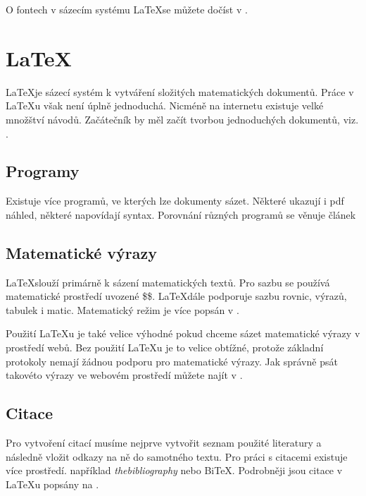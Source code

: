 \documentclass[a4paper,11pt]{article}
\begin{document}
			O fontech v sázecím systému \LaTeX se můžete dočíst v \cite{olsak}.
			
	\section{\LaTeX}
		\LaTeX je sázecí systém k vytváření složitých matematických dokumentů. Práce v \LaTeX u však není úplně jednoduchá. Nicméně na internetu existuje velké množštví návodů. Začátečník by měl začít tvorbou jednoduchých dokumentů, viz. \cite{overleaf}.
		
		\subsection{Programy}
			Existuje více programů, ve kterých lze dokumenty sázet. Některé ukazují i pdf náhled, některé napovídají syntax. Porovnání různých programů se věnuje článek \cite{programs}
		
		\subsection{Matematické výrazy}
			\LaTeX slouží primárně k sázení matematických textů. Pro sazbu se používá matematické prostředí uvozené \$\$. \LaTeX dále podporuje sazbu rovnic, výrazů, tabulek i matic. Matematický režim je více popsán v \cite{mathlatex}.
		
			\vspace{10pt}
			
			Použití \LaTeX u je také velice výhodné pokud chceme sázet matematické výrazy v prostředí webů. Bez použití \LaTeX u je to velice obtížné, protože základní protokoly nemají žádnou podporu pro matematické výrazy. Jak správně psát takovéto výrazy ve webovém prostředí můžete najít v \cite{webmath}. 
			
		\subsection{Citace}
			Pro vytvoření citací musíme nejprve vytvořit seznam použité literatury a následně vložit odkazy na ně do samotného textu. Pro práci s citacemi existuje více prostředí. například \emph{thebibliography} nebo BiTeX. Podrobněji jsou citace v \LaTeX u popsány na \cite{citation}.

	\newpage
	
	\renewcommand{\refname}{Literatura}
	
\end{document}
